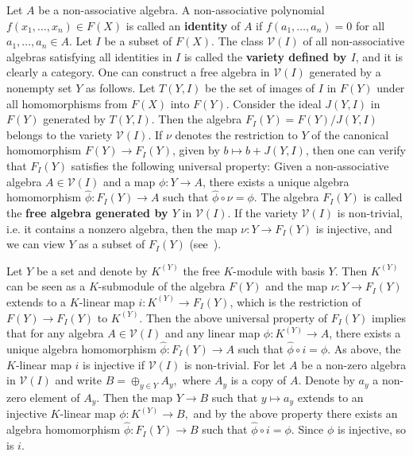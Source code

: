 \documentclass[11pt]{amsart}
\numberwithin{equation}{section}
\theoremstyle{definition}
\theoremstyle{remark}
\begin{document}
Let \( A \) be a non-associative algebra. A non-associative polynomial \( f(x_1, \ldots, x_n) \in F(X) \) is called an \textbf{identity} of \( A \) if \( f(a_1, \ldots, a_n) = 0 \) for all \( a_1, \ldots, a_n \in A \). Let \( I \) be a subset of \( F(X) \). The class \( \mathcal{V}(I) \) of all  non-associative algebras satisfying all identities in \( I \) is called the \textbf{variety defined by \( I \)}, and it is clearly a category. One can construct a free algebra in \( \mathcal{V}(I) \) generated by a nonempty set \( Y \) as follows. Let \( T(Y, I) \) be the set of images of \( I \) in \( F(Y) \) under all homomorphisms from \( F(X) \) into \( F(Y) \). Consider the ideal \( J(Y, I) \) in \( F(Y) \) generated by \( T(Y, I) \). Then the algebra \( F_I(Y) = F(Y) / J(Y, I) \) belongs to the variety \( \mathcal{V}(I) \). If \( \nu \) denotes the restriction to \( Y \) of the canonical homomorphism \( F(Y) \to F_I(Y) \), given by \( b \mapsto b + J(Y, I) \), then one can verify that \( F_I(Y) \) satisfies the following universal property: Given a non-associative algebra \( A \in \mathcal{V}(I) \) and a map \( \phi: Y \to A \), there exists a unique algebra homomorphism \( \widehat{\phi}: F_I(Y) \to A \) such that \( \widehat{\phi} \circ \nu = \phi \). The algebra \( F_I(Y) \) is called the \textbf{free algebra generated by \( Y \)} in \( \mathcal{V}(I) \). If the variety \( \mathcal{V}(I) \) is non-trivial, i.e. it contains a nonzero algebra, then the map \( \nu: Y \to F_I(Y) \) is injective, and we can view \( Y \) as a subset of \( F_I(Y) \) (see~\cite[p.~26]{Book_Jacobson_1968_SRJA}). 

 Let $Y$ be a set and denote by $K^{(Y)}$ the  free \( K \)-module with basis $Y.$ Then $K^{(Y)}$ can be seen as a $K$-submodule of the algebra  $ F(Y)$ and the map \( \nu: Y \to F_I(Y) \)  extends to a $K$-linear map    \( i: K^{(Y)} \to F_I(Y) \), which is the restriction of  \( F(Y) \to F_I(Y) \) to $K^{(Y)}.$
Then the above universal property of $ F_I(Y)$ implies that  for any  algebra \( A \in \mathcal{V}(I) \) and any linear map \( \phi: K^{(Y)} \to A \), there exists a unique algebra homomorphism \( \widehat{\phi}: F_I(Y) \to A \) such that \( \widehat{\phi} \circ i = \phi \). As above, the $K$-linear map    \( i \) is injective if  \( \mathcal{V}(I) \)  is non-trivial. For  let $A$ be  a non-zero algebra in  \( \mathcal{V}(I) \) and write 
$B = \oplus _{y\in Y} A_y,$ where $A_y$ is a copy  of  $A.$ Denote by $a_y$ a  non-zero element of $ A_y.$ Then the map $Y\to B$ such that $y\mapsto a_y$  extends to an injective $K$-linear map $\phi : K^{(Y)} \to B,$ and by the above property there exists an  algebra homomorphism \( \widehat{\phi}: F_I(Y) \to B \) such that \( \widehat{\phi} \circ i = \phi \). Since $\phi $ is injective, so is  $i.$  
\end{document}
